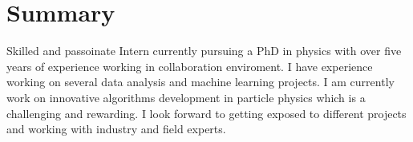 \section{Summary}


Skilled and passoinate Intern currently pursuing a PhD in physics with over five years of experience working 
in collaboration enviroment. I have experience working on several data analysis and machine learning projects. 
I am currently work on innovative algorithms development in particle physics which is a challenging and rewarding.
I look forward to getting exposed to different projects and working with industry and field experts.

